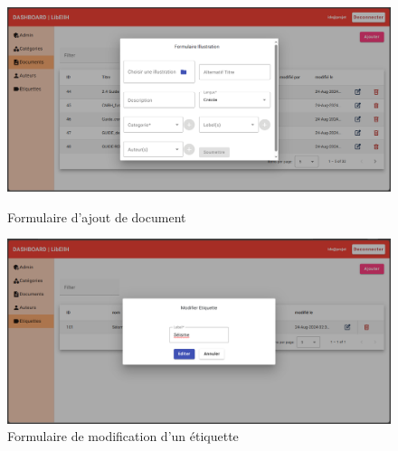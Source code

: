 				
		\begin{figure}
			\centering
			\begin{minipage}{0.45\textwidth}
				\centering
				\includegraphics[width=\textwidth]{Pictures/Dashboard_AjouterDoc.png}
				\caption{Formulaire d'ajout de document}
				\label{FigFormulaireAjouterDocument}
			\end{minipage}
			\hspace{5pt}
			\begin{minipage}{0.45\textwidth}
				\centering
				\includegraphics[width=\textwidth]{Pictures/Dashboard_ModifierEtiquette.png}
				\caption{Formulaire de modification d'un \'etiquette}
				\label{FigFormulaireModifierEtiquette}
			\end{minipage}
		\end{figure}
	 			



